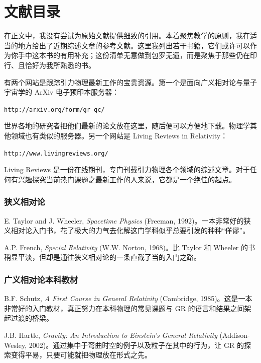 
\chapter*{文献目录}

在正文中，我没有尝试为原始文献提供细致的引用。本着聚焦教学的原则，我在适当的地方给出了近期综述文章的参考文献。这里我列出若干书籍，它们或许可以作为你手中这本书的有用补充；这份清单无意做到包罗无遗，而是聚焦于那些仍在印行、且恰好为我所熟悉的书。

有两个网站是跟踪引力物理最新工作的宝贵资源。第一个是面向广义相对论与量子宇宙学的 ArXiv 电子预印本服务器：

\begin{center}
\texttt{http://arxiv.org/form/gr-qc/}
\end{center}

世界各地的研究者把他们最新的论文放在这里，随后便可以方便地下载。物理学其他领域也有类似的服务器。另一个网站是 Living Reviews in Relativity：

\begin{center}
\texttt{http://www.livingreviews.org/}
\end{center}

Living Reviews 是一份在线期刊，专门刊载引力物理各个领域的综述文章。对于任何有兴趣探究当前热门课题之最新工作的人来说，它都是一个绝佳的起点。

\subsection*{狭义相对论}

E. Taylor and J. Wheeler, \emph{Spacetime Physics} (Freeman, 1992)。一本非常好的狭义相对论入门书，花了极大的力气去化解这门学科似乎总要引发的种种“佯谬”。

A.P. French, \emph{Special Relativity} (W.W. Norton, 1968)。比 Taylor 和 Wheeler 的书稍显平淡，但却是通往狭义相对论的一条直截了当的入门之路。

\subsection*{广义相对论本科教材}

B.F. Schutz, \emph{A First Course in General Relativity} (Cambridge, 1985)。这是一本非常好的入门教材，真正努力在本科物理的常见课题与 GR 的语言和结果之间架起过渡的桥梁。

J.B. Hartle, \emph{Gravity: An Introduction to Einstein's General Relativity} (Addison-Wesley, 2002)。通过集中于弯曲时空的例子以及粒子在其中的行为，让 GR 的探索变得平易，只要可能就把物理放在形式之先。

